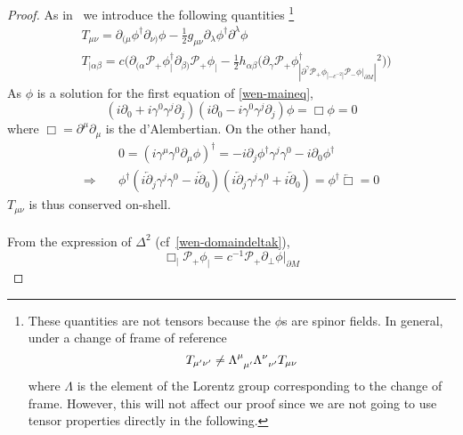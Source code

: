 \begin{proof}
As in~\cite{Zahn2016} we introduce the following quantities
\footnote{
These quantities are not tensors because the $\phi$s are spinor fields. 
In general, under a change of frame of reference
\begin{equation*}
T_{\mu'\nu'} \neq \Lambda^\mu_{\enskip \mu'}\Lambda^\nu_{\enskip \nu'}T_{\mu \nu} 
\end{equation*}
where $\Lambda$ is the element of the Lorentz group corresponding to the change of frame.
However, 
this will not affect our proof since we are not going to use tensor properties directly in the following.
}
\begin{equation*}
\begin{split}
& T_{\mu\nu} = \partial_{(\mu} \phi^\dagger \partial_{\nu)} \phi - \frac{1}{2}g_{\mu\nu} \partial_\lambda\phi^\dagger\partial^\lambda\phi  \\
& T_{|\alpha\beta} = c\Big( \partial_{(\alpha}\mathcal{P}_+\phi^\dagger_| \partial_{\beta)}\mathcal{P}_+\phi_| - 
\frac{1}{2}h_{\alpha\beta}\big( \partial_\gamma\mathcal{P}_+\phi^\dagger_| \partial^\gamma\mathcal{P}_+\phi_|
 - c^{-2}|\mathcal{P}_- \phi\vert_{\partial M}|^2 \big)\Big) 
\end{split}
\end{equation*}
As $\phi$ is a solution for the first equation of \cref{wen-maineq},
\begin{equation*}
(i\partial_0 + i\gamma^0\gamma^j\partial_j)( i\partial_0 -i\gamma^0\gamma^j\partial_j)\phi  = 
\Box \phi= 0
\end{equation*}
where $\Box = \partial^\mu\partial_\mu$ is the d'Alembertian.
On the other hand, 
\begin{equation*}
\begin{split}
&0 = (i\gamma^\mu\gamma^0\partial_\mu\phi)^\dagger
= - i\partial_j\phi^\dagger\gamma^j\gamma^0 - i\partial_0\phi^\dagger \\
\Rightarrow \quad &
\phi^\dagger(i\overleftarrow{\partial}_j\gamma^j\gamma^0 - i\overleftarrow{\partial}_0)
(i\overleftarrow{\partial}_j\gamma^j\gamma^0 + i\overleftarrow{\partial}_0)
= \phi^\dagger \overleftarrow{\Box} = 0
\end{split}
\end{equation*}
$T_{\mu\nu}$ is thus conserved on-shell. \\\\
From the expression of $\Delta^2$ (cf~\cref{wen-domaindeltak}), 
\begin{equation*}
\Box_|\mathcal{P}_+ \phi_| = c^{-1}\mathcal{P}_+\partial_\bot \phi\vert_{\partial M}

\end{equation*}
\end{proof}

